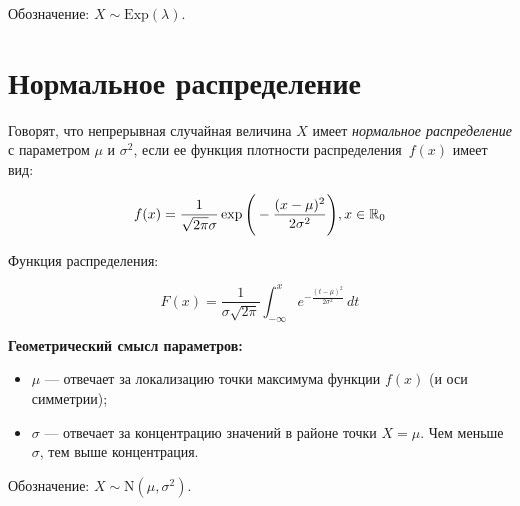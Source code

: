 



Обозначение: $X \sim \mathrm{Exp}(\lambda)$.

\chapter{Нормальное распределение}

Говорят, что  непрерывная случайная величина $X$ имеет \textit{нормальное распределение} с параметром $\mu$ и $\sigma^2$, если ее функция плотности распределения~$f(x)$ имеет вид:

\begin{equation}
	f(x) = \frac{1}{\sqrt{2\pi} \sigma} \exp\Bigg( -\frac{(x - \mu)^2}{2\sigma^2} \Bigg), \space x \in \mathbb{R}_0
\end{equation}

Функция распределения: 

\begin{equation}
	F(x) = \frac{1}{\sigma \sqrt{2\pi}} \int_{-\infty}^{x} e^{ -\frac{(t - \mu)^2}{2\sigma^2} } \, dt
\end{equation}

\textbf{Геометрический смысл параметров:}

\begin{itemize}
	\item  $\mu$ --- отвечает за локализацию точки максимума функции $f(x)$ (и оси симметрии);
	
	\item $\sigma$ --- отвечает за концентрацию значений в районе точки $X=\mu$. Чем меньше $\sigma$, тем выше концентрация.
\end{itemize}

Обозначение: $X \sim \mathrm{N}(\mu, \sigma^2)$.